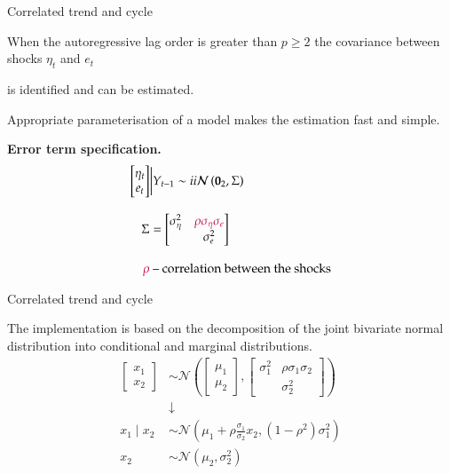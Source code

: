 \documentclass[notes,blackandwhite,mathsans,usenames,dvipsnames]{beamer}
\begin{document}
\begin{frame}{Correlated trend and cycle}


{\color{mcxs2}When the autoregressive lag order is greater than} $p\geq2$ {\color{mcxs2}the covariance between shocks} $\eta_t$ {\color{mcxs2}and} $e_t$ {\color{mcxs2}is identified and can be estimated.

\bigskip Appropriate parameterisation of a model makes the estimation fast and simple.
}

\bigskip\textbf{Error term specification.}
\begin{align*}
\begin{bmatrix}\eta_t \\ e_t\end{bmatrix}&\bigg|Y_{t-1} \sim ii\mathcal{N}\left(\mathbf{0}_2, \Sigma \right)\\[2ex]
\Sigma &= \begin{bmatrix}\sigma_\eta^2 & {\color{purple}\rho \sigma_\eta \sigma_e} \\  & \sigma_e^2\end{bmatrix}\\[2ex]
{\color{purple}\rho}&\text{ -- correlation between the shocks} 
\end{align*}

\end{frame}





\begin{frame}{Correlated trend and cycle}

{\color{mcxs2}The implementation is based on the decomposition of the joint bivariate normal distribution into  conditional and marginal distributions.}
\begin{align*}
\begin{bmatrix}x_1\\ x_2\end{bmatrix}&\sim\mathcal{N}\left(\begin{bmatrix}\mu_1\\ \mu_2\end{bmatrix},\begin{bmatrix}\sigma_1^2& \rho\sigma_1\sigma_2\\&\sigma_2^2\end{bmatrix}\right)\\[1ex]
&\downarrow\\[1ex]
x_1\mid x_2 &\sim \mathcal{N}\left( \mu_1 + \rho\frac{\sigma_1}{\sigma_2}x_2, \left(1-\rho^2\right)\sigma_1^2\right)\\
x_2 &\sim \mathcal{N}\left( \mu_2, \sigma_2^2\right)
\end{align*}

\end{frame}
\end{document}
